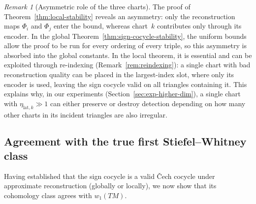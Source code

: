 \documentclass[11pt]{article}
\theoremstyle{plain}
\theoremstyle{definition}
\theoremstyle{remark}
\newtheorem{remark}[theorem]{Remark}
\begin{document}
\begin{remark}[Asymmetric role of the three charts]\label{rem:asymmetric}
The proof of Theorem~\ref{thm:local-stability} reveals an asymmetry: only the reconstruction maps $\Phi_i$ and $\Phi_j$ enter the bound, whereas chart~$k$ contributes only through its encoder. In the global Theorem~\ref{thm:sign-cocycle-stability}, the uniform bounds allow the proof to be run for every ordering of every triple, so this asymmetry is absorbed into the global constants. In the local theorem, it is essential and can be exploited through re-indexing (Remark~\ref{rem:reindexing}): a single chart with bad reconstruction quality can be placed in the largest-index slot, where only its encoder is used, leaving the sign cocycle valid on all triangles containing it. This explains why, in our experiments (Section~\ref{sec:exp-higher-dim}), a single chart with $\eta_{\mathrm{lat},k} \gg 1$ can either preserve or destroy detection depending on how many other charts in its incident triangles are also irregular.
\end{remark}

\subsection{Agreement with the true first Stiefel--Whitney class}

Having established that the sign cocycle is a valid \v{C}ech cocycle under approximate reconstruction (globally or locally), we now show that its cohomology class agrees with $w_1(TM)$.
\end{document}
